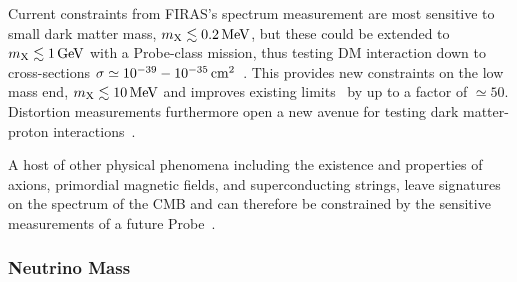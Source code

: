 Current constraints from FIRAS's spectrum measurement are most sensitive to small dark matter
mass, $m_{\rm X}\lesssim 0.2\,{\rm MeV}$, but these could be extended to $m_{\rm X}\lesssim 1\,{\rm GeV}$ with a 
Probe-class mission, thus testing DM interaction down to cross-sections 
$\sigma\simeq 10^{-39}-10^{-35}\,{\rm cm}^2$~\cite{Yacine2015DM}. This provides new constraints on the low mass 
end, $m_{\rm X}\lesssim 10\,{\rm MeV}$ and improves existing limits~\cite{Essig2012PhRvL.109b1301E, Boehm2014MNRAS.445L..31B} 
by up to a factor of $\simeq 50$. Distortion measurements furthermore open a new avenue for 
testing dark matter-proton interactions~\cite{Yacine2015DM}.

A host of other physical phenomena including the existence and properties of axions, primordial magnetic fields, and 
superconducting strings, leave signatures on the spectrum of the CMB and can therefore be constrained by 
the sensitive measurements  of a future Probe~\cite[e.g.,][]{Jedamzik2000, Tashiro2012, Dolgov2013, Tashiro2013, Caldwell2013}.

\vspace{-0.18in}

\subsubsection{Neutrino Mass}

\vspace{-0.05in}

